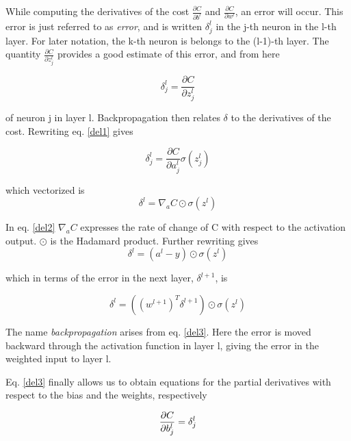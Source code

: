 \documentclass[a4paper,11pt,twocolumn]{article}
\begin{document}
While computing the  derivatives of the cost $\frac{\partial C}{\partial b^l}$ and $\frac{\partial C}{\partial w^l}$, an error will occur. This error is just referred to as \textit{error}, and is written $\delta_j^l$ in the j-th neuron in the l-th layer. For later notation, the k-th neuron is belongs to the (l-1)-th layer. The quantity $\frac{\partial C}{\partial z_j^l}$ provides a good estimate of this error, and from here 

\begin{equation}
\delta_j^l = \frac{\partial C}{\partial z_j^l}
\label{del1}
\end{equation}

of neuron j in layer l. Backpropagation then relates $\delta$ to the derivatives of the cost. Rewriting eq. \eqref{del1} gives

\begin{equation}
\delta_j^l = \frac{\partial C}{\partial a_j^l} \sigma(z_j^l)
\label{del2}
\end{equation}

which vectorized is 
\begin{equation}
\delta^l = \nabla_aC \odot\sigma(z^l)
\label{del2}
\end{equation}

In eq. \eqref{del2} $\nabla_aC$ expresses the rate of change of C with respect to the activation output. $\odot$ is the Hadamard product. Further rewriting gives 
\begin{equation}
\delta^l = (a^l - y)\odot \sigma(z^l)
\end{equation}

which in terms of the error in the next layer, $\delta^{l+1}$, is

\begin{equation}
\delta^l = ((w^{l+1})^T\delta^{l+1})\odot \sigma(z^l)
\label{del3}
\end{equation}

The name \textit{backpropagation} arises from eq. \eqref{del3}.  Here the error is moved backward through the activation function in layer l, giving the error in the weighted input to layer l. 

Eq. \eqref{del3} finally allows us to obtain equations for the partial derivatives with respect to the bias and the weights, respectively

\begin{equation}
\frac{\partial C}{\partial b_j^l} = \delta_j^l \\
\end{equation}
\end{document}
